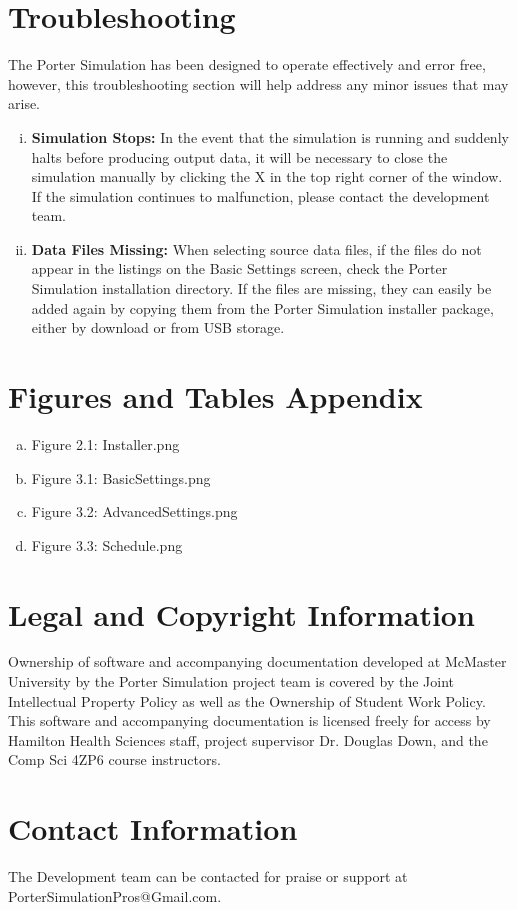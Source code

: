 \documentclass[paper=letter, fontsize=10pt]{scrartcl}
\numberwithin{equation}{section}		%
\numberwithin{figure}{section}			%
\numberwithin{table}{section}				%
\begin{document}
\section{Troubleshooting}
The Porter Simulation has been designed to operate effectively and error free, however, this troubleshooting section will help address any minor issues that may arise.

\begin{enumerate}[(i)]
	\item \textbf{Simulation Stops:} In the event that the simulation is running and suddenly halts before producing output data, it will be necessary to close the simulation manually by clicking the X in the top right corner of the window. If the simulation continues to malfunction, please contact the development team.
	\item \textbf{Data Files Missing:} When selecting source data files, if the files do not appear in the listings on the Basic Settings screen, check the Porter Simulation installation directory. If the files are missing, they can easily be added again by copying them from the Porter Simulation installer package, either by download or from USB storage.
\end{enumerate}

\section{Figures and Tables Appendix}
\begin{enumerate}[(a)]
	\item Figure 2.1: Installer.png
	\item Figure 3.1: BasicSettings.png
	\item Figure 3.2: AdvancedSettings.png
	\item Figure 3.3: Schedule.png
\end{enumerate}

\section{Legal and Copyright Information}
Ownership of software and accompanying documentation developed at McMaster University by the Porter Simulation project team is covered by the Joint Intellectual Property Policy as well as the Ownership of Student Work Policy. This software and accompanying documentation is licensed freely for access by Hamilton Health Sciences staff, project supervisor Dr. Douglas Down, and the Comp Sci 4ZP6 course instructors.

\section{Contact Information}
The Development team can be contacted for praise or support at PorterSimulationPros@Gmail.com.



\end{document}
